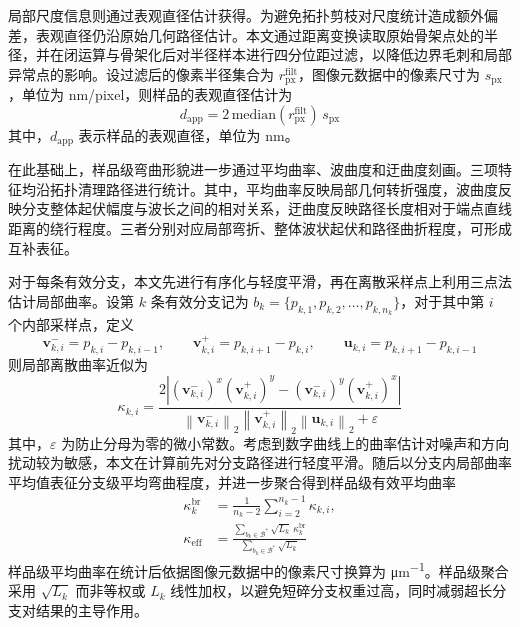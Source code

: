 局部尺度信息则通过表观直径估计获得。为避免拓扑剪枝对尺度统计造成额外偏差，表观直径仍沿原始几何路径估计。本文通过距离变换读取原始骨架点处的半径，并在闭运算与骨架化后对半径样本进行四分位距过滤，以降低边界毛刺和局部异常点的影响。设过滤后的像素半径集合为 $r_{\mathrm{px}}^{\mathrm{filt}}$，图像元数据中的像素尺寸为 $s_{\mathrm{px}}$，单位为 \si{nm/pixel}，则样品的表观直径估计为
\begin{equation}
    d_{\mathrm{app}}=2\,\mathrm{median}\!\left(r_{\mathrm{px}}^{\mathrm{filt}}\right)\,s_{\mathrm{px}}
\end{equation}
其中，$d_{\mathrm{app}}$ 表示样品的表观直径，单位为 nm。

在此基础上，样品级弯曲形貌进一步通过平均曲率、波曲度和迂曲度刻画。三项特征均沿拓扑清理路径进行统计。其中，平均曲率反映局部几何转折强度，波曲度反映分支整体起伏幅度与波长之间的相对关系，迂曲度反映路径长度相对于端点直线距离的绕行程度。三者分别对应局部弯折、整体波状起伏和路径曲折程度，可形成互补表征。

对于每条有效分支，本文先进行有序化与轻度平滑，再在离散采样点上利用三点法估计局部曲率。设第 $k$ 条有效分支记为 $b_k=\{p_{k,1},p_{k,2},\ldots,p_{k,n_k}\}$，对于其中第 $i$ 个内部采样点，定义
\begin{equation}
    \mathbf{v}_{k,i}^{-}=p_{k,i}-p_{k,i-1},\qquad
    \mathbf{v}_{k,i}^{+}=p_{k,i+1}-p_{k,i},\qquad
    \mathbf{u}_{k,i}=p_{k,i+1}-p_{k,i-1}
\end{equation}
则局部离散曲率近似为
\begin{equation}
    \kappa_{k,i}=
    \frac{2\left|
    \left(\mathbf{v}_{k,i}^{-}\right)^{x}\left(\mathbf{v}_{k,i}^{+}\right)^{y}-
    \left(\mathbf{v}_{k,i}^{-}\right)^{y}\left(\mathbf{v}_{k,i}^{+}\right)^{x}
    \right|}
    {\left\|\mathbf{v}_{k,i}^{-}\right\|_2
    \left\|\mathbf{v}_{k,i}^{+}\right\|_2
    \left\|\mathbf{u}_{k,i}\right\|_2+\varepsilon}
\end{equation}
其中，$\varepsilon$ 为防止分母为零的微小常数。考虑到数字曲线上的曲率估计对噪声和方向扰动较为敏感\cite{Kerautret2009Curvature,Vieilleville2009Tangent,Frette2009Curvature}，本文在计算前先对分支路径进行轻度平滑。随后以分支内局部曲率平均值表征分支级平均弯曲程度，并进一步聚合得到样品级有效平均曲率
\begin{equation}
    \begin{aligned}
        \kappa_{k}^{\mathrm{br}}
        &=\frac{1}{n_k-2}\sum_{i=2}^{n_k-1}\kappa_{k,i},\\
        \kappa_{\mathrm{eff}}
        &=\frac{\sum_{b_k\in\mathcal{B}^{*}}\sqrt{L_k}\,\kappa_{k}^{\mathrm{br}}}
        {\sum_{b_k\in\mathcal{B}^{*}}\sqrt{L_k}}
    \end{aligned}
\end{equation}
样品级平均曲率在统计后依据图像元数据中的像素尺寸换算为 \si{\micro\meter^{-1}}。样品级聚合采用 $\sqrt{L_k}$ 而非等权或 $L_k$ 线性加权，以避免短碎分支权重过高，同时减弱超长分支对结果的主导作用。

